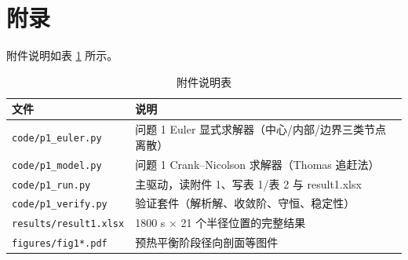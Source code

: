 \appendix
\section{附录}
附件说明如表 \ref{tab:appendix} 所示。

\begin{table}[H]
  \centering
  \caption{附件说明表}
  \label{tab:appendix}
  \begin{tabular}{ll}
    \toprule
    文件 & 说明 \\
    \midrule
    \texttt{code/p1\_euler.py} & 问题 1 Euler 显式求解器（中心/内部/边界三类节点离散） \\
    \texttt{code/p1\_model.py} & 问题 1 Crank--Nicolson 求解器（Thomas 追赶法） \\
    \texttt{code/p1\_run.py} & 主驱动，读附件 1、写表 1/表 2 与 result1.xlsx \\
    \texttt{code/p1\_verify.py} & 验证套件（解析解、收敛阶、守恒、稳定性） \\
    \texttt{results/result1.xlsx} & 1800 s $\times$ 21 个半径位置的完整结果 \\
    \texttt{figures/fig1*.pdf} & 预热平衡阶段径向剖面等图件 \\
    \bottomrule
  \end{tabular}
\end{table}

